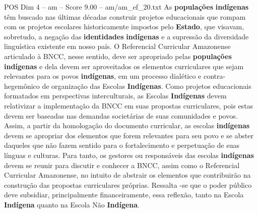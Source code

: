 \begin{textsample}{POS Dim 4 – am – Score 9.00 – am/am\_ef\_20.txt}
As \textbf{populações} \textbf{indígenas} têm buscado nas últimas décadas construir projetos educacionais que rompam com os projetos escolares historicamente impostos pelo \textbf{Estado}, que visavam, sobretudo, a negação das \textbf{identidades} \textbf{indígenas} e a supressão da diversidade linguística existente em nosso país.
O Referencial Curricular Amazonense articulado à BNCC, nesse sentido, deve ser apropriado pelas \textbf{populações} \textbf{indígenas} e dela devem ser aproveitados os elementos curriculares que sejam relevantes para os povos \textbf{indígenas}, em um processo dialético e contra-hegemônico de organização das Escolas \textbf{Indígenas}.
Como projetos educacionais formatados em perspectivas interculturais, as Escolas \textbf{Indígenas} devem relativizar a implementação da BNCC em suas propostas curriculares, pois estas devem ser baseadas nas demandas societárias de suas comunidades e povos.
Assim, a partir da homologação do documento curricular, as escolas \textbf{indígenas} devem se apropriar dos elementos que forem relevantes para seu povo e se abster daqueles que não fazem sentido para o fortalecimento e perpetuação de suas línguas e culturas.
Para tanto, os gestores ou responsáveis das escolas \textbf{indígenas} devem se reunir para discutir e conhecer a BNCC, assim como o Referencial Curricular Amazonense, no intuito de abstrair os elementos que contribuirão na construção das propostas curriculares próprias.
Ressalta -se que o poder público deve subsidiar, principalmente financeiramente, essa reflexão, tanto na Escola \textbf{Indígena} quanto na Escola Não \textbf{Indígena}.

\end{textsample}
